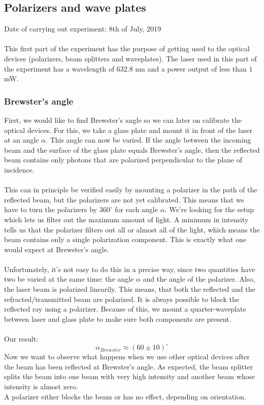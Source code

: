 \subsection{Polarizers and wave plates}
Date of carrying out experiment: 8th of July, 2019 \\ \\
This first part of the experiment has the purpose of getting used
to the optical devices (polarizers, beam splitters and waveplates).
The laser used in this part of the experiment has a wavelength of $632.8$
nm and a power output of less than $1$ mW.

\subsubsection{Brewster's angle}
First, we would like to find Brewster's angle so we can
later on calibrate the optical devices. For this, we take a glass plate
and mount it in front of the laser at an angle $\alpha$. This angle can now
be varied. If the angle between the incoming
beam and the surface of the glass plate equals Brewster's 
angle, then the reflected beam contains only photons that are polarized
perpendicular to the plane of incidence. \\ \\ This can in principle
be verified easily by mounting a polarizer in the path of the reflected
beam, but the polarizers are not yet calibrated. This means that we have
to turn the polarizers by $360^\circ$ for each angle $\alpha$. We're
looking for the setup which lets us filter out the maximum amount of light.
A minimum in intensity tells us that the polarizer filters out all or
almost all
of the light, which means the beam contains only a single polarization
component. This is exactly what one would expect at Brewster's angle. \\ \\
Unfortunately, it's not easy to do this in a precise way, since two
quantities have two be varied at the same time: the angle $\alpha$ and
the angle of the polarizer. Also, the laser beam is polarized linearily.
This means, that both the reflected and the refracted/transmitted beam
are polarized. It is always possible to block the reflected ray using a
polarizer. Because of this, we mount a quarter-waveplate between
laser and glass plate to make sure both components are present. \\ \\
Our result:
$$\alpha_{Brewster}\approx(60\pm10)^\circ$$
Now we want to observe what happens when we use other optical devices after
the beam has been reflected at Brewster's angle. As expected, the beam
splitter splits the beam into one beam with very high intensity and
another beam whose intensity is almost zero. \\
A polarizer either blocks the beam or has no effect,
depending on orientation.

